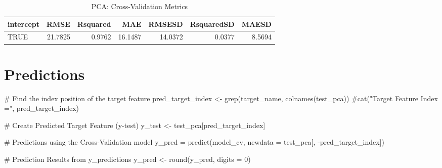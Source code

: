 \documentclass[
  letterpaper,
  DIV=11,
  numbers=noendperiod]{scrreprt}
\newenvironment{Shaded}{\begin{snugshade}}{\end{snugshade}}
\newcommand{\AttributeTok}[1]{\textcolor[rgb]{0.40,0.45,0.13}{#1}}
\newcommand{\CommentTok}[1]{\textcolor[rgb]{0.37,0.37,0.37}{#1}}
\newcommand{\DecValTok}[1]{\textcolor[rgb]{0.68,0.00,0.00}{#1}}
\newcommand{\FunctionTok}[1]{\textcolor[rgb]{0.28,0.35,0.67}{#1}}
\newcommand{\NormalTok}[1]{\textcolor[rgb]{0.00,0.23,0.31}{#1}}
\newcommand{\OtherTok}[1]{\textcolor[rgb]{0.00,0.23,0.31}{#1}}
\newcommand{\SpecialCharTok}[1]{\textcolor[rgb]{0.37,0.37,0.37}{#1}}
\begin{document}
\begin{table}

\caption{PCA: Cross-Validation Metrics}
\centering
\begin{tabular}[t]{l|r|r|r|r|r|r}
\hline
intercept & RMSE & Rsquared & MAE & RMSESD & RsquaredSD & MAESD\\
\hline
TRUE & 21.7825 & 0.9762 & 16.1487 & 14.0372 & 0.0377 & 8.5694\\
\hline
\end{tabular}
\end{table}

\hypertarget{predictions}{%
\section{Predictions}\label{predictions}}

\begin{Shaded}
\begin{Highlighting}[]
\CommentTok{\# Find the index position of the target feature}
\NormalTok{pred\_target\_index }\OtherTok{\textless{}{-}} \FunctionTok{grep}\NormalTok{(target\_name, }
                     \FunctionTok{colnames}\NormalTok{(test\_pca))}
\CommentTok{\#cat("Target Feature Index =", pred\_target\_index)}

\CommentTok{\# Create Predicted Target Feature (y{-}test) }
\NormalTok{y\_test }\OtherTok{\textless{}{-}}\NormalTok{ test\_pca[pred\_target\_index]}
\end{Highlighting}
\end{Shaded}

\begin{Shaded}
\begin{Highlighting}[]
\CommentTok{\# Predictions using the Cross{-}Validation model}
\NormalTok{y\_pred }\OtherTok{=} \FunctionTok{predict}\NormalTok{(model\_cv, }\AttributeTok{newdata =}\NormalTok{ test\_pca[, }\SpecialCharTok{{-}}\NormalTok{pred\_target\_index])}
\end{Highlighting}
\end{Shaded}

\begin{Shaded}
\begin{Highlighting}[]
\CommentTok{\# Prediction Results from y\_predictions}
\NormalTok{y\_pred }\OtherTok{\textless{}{-}} \FunctionTok{round}\NormalTok{(y\_pred, }\AttributeTok{digits =} \DecValTok{0}\NormalTok{)}
\end{Highlighting}
\end{Shaded}
\end{document}
